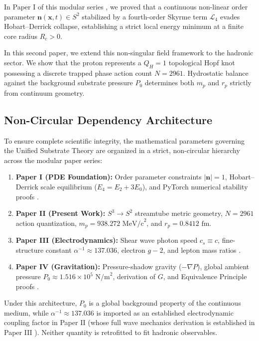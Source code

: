 \documentclass[11pt,a4paper]{article}
\begin{document}
	In Paper I of this modular series \cite{PaperI}, we proved that a continuous non-linear order parameter $\mathbf{n}(\mathbf{x}, t) \in S^2$ stabilized by a fourth-order Skyrme term $\mathcal{L}_4$ evades Hobart--Derrick collapse, establishing a strict local energy minimum at a finite core radius $R_c > 0$.
	
	In this second paper, we extend this non-singular field framework to the hadronic sector. We show that the proton represents a $Q_H = 1$ topological Hopf knot possessing a discrete trapped phase action count $N = 2961$. Hydrostatic balance against the background substrate pressure $P_0$ determines both $m_p$ and $r_p$ strictly from continuum geometry.
	
	\subsection{Non-Circular Dependency Architecture}
	To ensure complete scientific integrity, the mathematical parameters governing the Unified Substrate Theory are organized in a strict, non-circular hierarchy across the modular paper series:
	\begin{enumerate}
		\item \textbf{Paper I (PDE Foundation):} Order parameter constraints $|\mathbf{n}|=1$, Hobart--Derrick scale equilibrium ($E_4 = E_2 + 3E_0$), and PyTorch numerical stability proofs \cite{PaperI}.
		\item \textbf{Paper II (Present Work):} $S^3 \to S^2$ streamtube metric geometry, $N = 2961$ action quantization, $m_p = 938.272 \text{ MeV/c}^2$, and $r_p = 0.8412 \text{ fm}$.
		\item \textbf{Paper III (Electrodynamics):} Shear wave photon speed $c_s \equiv c$, fine-structure constant $\alpha^{-1} \approx 137.036$, electron $g-2$, and lepton mass ratios \cite{PaperIII}.
		\item \textbf{Paper IV (Gravitation):} Pressure-shadow gravity ($-\nabla P$), global ambient pressure $P_0 \approx 1.516 \times 10^5 \text{ N/m}^2$, derivation of $G$, and Equivalence Principle proofs \cite{PaperIV}.
	\end{enumerate}
	Under this architecture, $P_0$ is a global background property of the continuous medium, while $\alpha^{-1} \approx 137.036$ is imported as an established electrodynamic coupling factor in Paper II (whose full wave mechanics derivation is established in Paper III \cite{PaperIII}). Neither quantity is retrofitted to fit hadronic observables.
	
\end{document}
